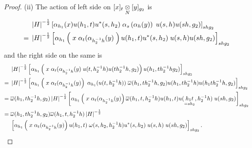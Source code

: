 \begin{proof}
	(ii) The action of left side on $ [x]_t \underset{N}{\otimes} [y]_{g_2} $ is
	\begin{align*}
		& \; \left|{H}\right |^{- \frac 1 2} \left[\alpha_{h_1} (x) u(h_1 , t) u^* (s ,h_2) \; \alpha_s \left( \alpha_h (y)  \right) \; u(s,h) u(sh,g_2)\right]_{shg_2}\\
		= & \; \left|{H}\right |^{- \frac 1 2} \left[\alpha_{h_1} \left(\; x \; \alpha_t (\alpha_{h^{-1}_2 h} (y) \;  \right) u(h_1 , t) u^* (s ,h_2) \;  u(s,h) u(sh,g_2) \right]_{shg_2}
	\end{align*}
	and the right side on the same is
	\begin{align*}
		& \; \left|{H}\right |^{- \frac 1 2}  \left[\alpha_{h_1} \left(\; x \; \alpha_t (\alpha_{h^{-1}_2 h} (y) \; u(t, h^{-1}_2 h) u(t h^{-1}_2 h, g_2)  \right) u(h_1 , t h^{-1}_2 h g_2) \right]_{shg_2}\\
		= & \; \left|{H}\right |^{- \frac 1 2}  \left[\alpha_{h_1} \left(\; x \; \alpha_t (\alpha_{h^{-1}_2 h} (y) \right) \; \alpha_{h_1} (u(t, h^{-1}_2 h) ) \; \overline{\omega} (h_1 , t h^{-1}_2 h , g_2) u (h_1 , t h^{-1}_2 h ) u (h_1  t h^{-1}_2 h , g_2) \right]_{shg_2}\\
		= & \; \overline{\omega} (h_1 , t h^{-1}_2 h , g_2) \left|{H}\right |^{- \frac 1 2}  \left[\alpha_{h_1} \left(\; x \; \alpha_t (\alpha_{h^{-1}_2 h} (y) \right) \overline{\omega} (h_1 , t , h^{-1}_2 h) u (h_1 , t ) u (\underset{=s h_2}{h_1  t} , h^{-1}_2 h) \;  u (s h , g_2) \right]_{shg_2}\\
		= & \; \overline{\omega} (h_1 , t h^{-1}_2 h , g_2)  \overline{\omega} (h_1 , t , h^{-1}_2 h) \left|{H}\right |^{- \frac 1 2}\\
		& \;\left[\alpha_{h_1} \left(\; x \; \alpha_t (\alpha_{h^{-1}_2 h} (y) \right) u (h_1 , t ) \; \omega (s, h_2 , h^{-1}_2 h) u^* (s ,h_2) \;  u(s,h) \;  u (s h , g_2) \right]_{shg_2}.
	\end{align*}
\end{proof}
